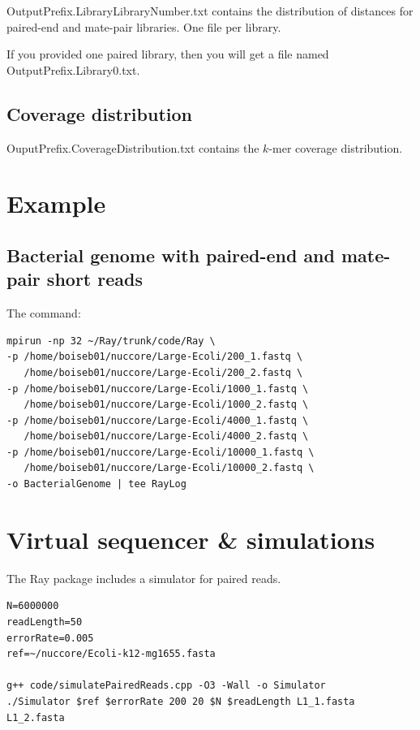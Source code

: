 \documentclass{article}
\begin{document}
OutputPrefix.LibraryLibraryNumber.txt contains the distribution of distances for paired-end and mate-pair libraries. One file per library.

If you provided one paired library, then you will get a file named OutputPrefix.Library0.txt.

\subsection{Coverage distribution}

OuputPrefix.CoverageDistribution.txt contains the $k$-mer coverage distribution.

\section{Example}

\subsection{Bacterial genome with paired-end and mate-pair short reads}

The command:

\begin{verbatim}
mpirun -np 32 ~/Ray/trunk/code/Ray \
-p /home/boiseb01/nuccore/Large-Ecoli/200_1.fastq \
   /home/boiseb01/nuccore/Large-Ecoli/200_2.fastq \
-p /home/boiseb01/nuccore/Large-Ecoli/1000_1.fastq \
   /home/boiseb01/nuccore/Large-Ecoli/1000_2.fastq \
-p /home/boiseb01/nuccore/Large-Ecoli/4000_1.fastq \
   /home/boiseb01/nuccore/Large-Ecoli/4000_2.fastq \
-p /home/boiseb01/nuccore/Large-Ecoli/10000_1.fastq \
   /home/boiseb01/nuccore/Large-Ecoli/10000_2.fastq \
-o BacterialGenome | tee RayLog
\end{verbatim}

\section{Virtual sequencer \& simulations}

The Ray package includes a simulator for paired reads.

\begin{verbatim}
N=6000000
readLength=50
errorRate=0.005
ref=~/nuccore/Ecoli-k12-mg1655.fasta

g++ code/simulatePairedReads.cpp -O3 -Wall -o Simulator 
./Simulator $ref $errorRate 200 20 $N $readLength L1_1.fasta L1_2.fasta
\end{verbatim}
\end{document}
